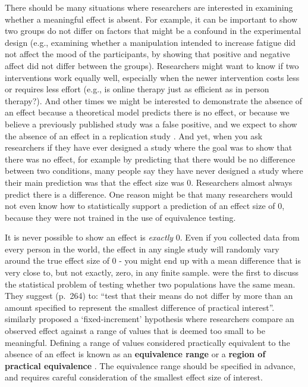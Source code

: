 \documentclass[
  oneside]{krantz}
\begin{document}
There should be many situations where researchers are interested in examining whether a meaningful effect is absent. For example, it can be important to show two groups do not differ on factors that might be a confound in the experimental design (e.g., examining whether a manipulation intended to increase fatigue did not affect the mood of the participants, by showing that positive and negative affect did not differ between the groups). Researchers might want to know if two interventions work equally well, especially when the newer intervention costs less or requires less effort (e.g., is online therapy just as efficient as in person therapy?). And other times we might be interested to demonstrate the absence of an effect because a theoretical model predicts there is no effect, or because we believe a previously published study was a false positive, and we expect to show the absence of an effect in a replication study \citep{dienes_using_2014}. And yet, when you ask researchers if they have ever designed a study where the goal was to show that there was no effect, for example by predicting that there would be no difference between two conditions, many people say they have never designed a study where their main prediction was that the effect size was 0. Researchers almost always predict there is a difference. One reason might be that many researchers would not even know how to statistically support a prediction of an effect size of 0, because they were not trained in the use of equivalence testing.

It is never possible to show an effect is \emph{exactly} 0. Even if you collected data from every person in the world, the effect in any single study will randomly vary around the true effect size of 0 - you might end up with a mean difference that is very close to, but not exactly, zero, in any finite sample. \citet{hodges_testing_1954} were the first to discuss the statistical problem of testing whether two populations have the same mean. They suggest (p.~264) to: ``test that their means do not differ by more than an amount specified to represent the smallest difference of practical interest''. \citet{nunnally_place_1960} similarly proposed a `fixed-increment' hypothesis where researchers compare an observed effect against a range of values that is deemed too small to be meaningful. Defining a range of values considered practically equivalent to the absence of an effect is known as an \textbf{equivalence range} \citep{bauer_unifying_1996} or a \textbf{region of practical equivalence} \citep{kruschke_bayesian_2013}. The equivalence range should be specified in advance, and requires careful consideration of the smallest effect size of interest.
\end{document}
